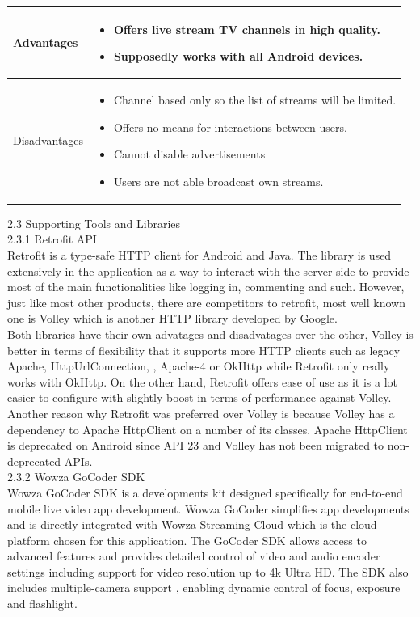 \documentclass{article}
\begin{document}
\begin{flushleft}
\begin{tabular}{| p{2.2cm} | p{9cm} |}
\hline
Advantages &
\begin{itemize}
	\item Offers live stream TV channels in high quality.
	\item Supposedly works with all Android devices.
\end{itemize}\\
\hline
Disadvantages &
\begin{itemize}
	\item Channel based only so the list of streams will be limited.
	\item Offers no means for interactions between users.
	\item Cannot disable advertisements
	\item Users are not able broadcast own streams.
\end{itemize}\\
\hline
\end{tabular} 
{\Large 2.3 Supporting Tools and Libraries}\\
{\large 2.3.1 Retrofit API}\\
Retrofit is a type-safe HTTP client for Android and Java. The library is used extensively in the application as a way to interact with the server side to provide most of the main functionalities like logging in, commenting and such. However, just like most other products, there are competitors to retrofit, most well known one is Volley which is another HTTP library developed by Google.\\
Both libraries have their own advatages and disadvatages over the other, Volley is better in terms of flexibility that it supports more HTTP clients such as legacy Apache, HttpUrlConnection, , Apache-4 or OkHttp while Retrofit only really works with OkHttp. On the other hand, Retrofit offers ease of use as it is a lot easier to configure with slightly boost in terms of performance against Volley. Another reason why Retrofit was preferred over Volley is because Volley has a dependency  to Apache HttpClient on a number of its classes. Apache HttpClient is deprecated on Android since API 23 and Volley has not been migrated to non-deprecated APIs.\\
{\large 2.3.2 Wowza GoCoder SDK\\}
Wowza GoCoder SDK is a developments kit designed specifically for end-to-end mobile live video app development. Wowza GoCoder simplifies app developments and is directly integrated with Wowza Streaming Cloud which is the cloud platform chosen for this application. The GoCoder SDK allows access to advanced features and provides detailed control of video and audio encoder settings including support for video resolution up to 4k Ultra HD. The SDK also includes multiple-camera support , enabling dynamic control of focus, exposure and flashlight.\\

\end{flushleft}
\end{document}
